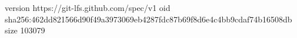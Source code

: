 version https://git-lfs.github.com/spec/v1
oid sha256:462dd821566d90f49a3973069eb4287fdc87b69f8d6e4c4bb9cdaf74b16508db
size 103079
